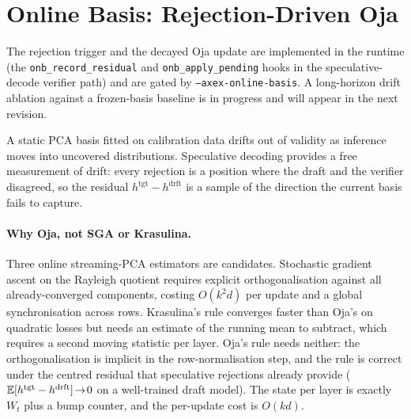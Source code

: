 \documentclass[11pt]{article}
\begin{document}
\section{Online Basis: Rejection-Driven Oja}
\label{sec:online}
The rejection trigger and the decayed Oja update are implemented in the
runtime (the \texttt{onb\_record\_residual} and
\texttt{onb\_apply\_pending} hooks in the speculative-decode verifier
path) and are gated by \texttt{--axex-online-basis}. A long-horizon
drift ablation against a frozen-basis baseline is in progress and will
appear in the next revision.

A static PCA basis fitted on calibration data drifts out of validity as
inference moves into uncovered distributions. Speculative decoding
\cite{leviathan2023speculative,chen2023speculative} provides a free
measurement of drift: every rejection is a position where the draft and
the verifier disagreed, so the residual $h^\text{tgt}-h^\text{drft}$ is
a sample of the direction the current basis fails to capture.

\paragraph{Why Oja, not SGA or Krasulina.}
Three online streaming-PCA estimators are candidates. Stochastic
gradient ascent on the Rayleigh quotient \cite{shamir2015fast} requires
explicit orthogonalisation against all already-converged components,
costing $O(k^2 d)$ per update and a global synchronisation across rows.
Krasulina's rule \cite{krasulina1969} converges faster than Oja's on
quadratic losses but needs an estimate of the running mean to subtract,
which requires a second moving statistic per layer. Oja's rule needs
neither: the orthogonalisation is implicit in the row-normalisation
step, and the rule is correct under the centred residual that
speculative rejections already provide
($\mathbb{E}[h^\text{tgt}-h^\text{drft}]\!\to\!0$ on a well-trained draft
model). The state per layer is exactly $W_t$ plus a bump counter, and
the per-update cost is $O(kd)$.
\end{document}
